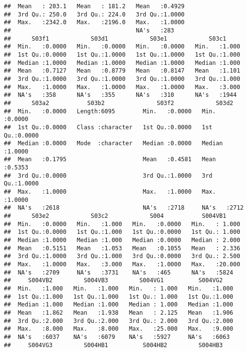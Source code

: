 \documentclass[
]{article}
\begin{document}
\begin{verbatim}
##  Mean   : 203.1   Mean   : 181.2   Mean   :0.4929                     
##  3rd Qu.: 250.0   3rd Qu.: 224.0   3rd Qu.:1.0000                     
##  Max.   :2342.0   Max.   :2196.0   Max.   :1.0000                     
##                                    NA's   :283                        
##      S03f1            S03d1            S03e1            S03c1      
##  Min.   :0.0000   Min.   :0.0000   Min.   :0.0000   Min.   :1.000  
##  1st Qu.:0.0000   1st Qu.:1.0000   1st Qu.:1.0000   1st Qu.:1.000  
##  Median :1.0000   Median :1.0000   Median :1.0000   Median :1.000  
##  Mean   :0.7127   Mean   :0.8779   Mean   :0.8147   Mean   :1.101  
##  3rd Qu.:1.0000   3rd Qu.:1.0000   3rd Qu.:1.0000   3rd Qu.:1.000  
##  Max.   :1.0000   Max.   :1.0000   Max.   :1.0000   Max.   :3.000  
##  NA's   :358      NA's   :355      NA's   :310      NA's   :1944   
##      S03a2           S03b2               S03f2            S03d2       
##  Min.   :0.0000   Length:6095        Min.   :0.0000   Min.   :0.0000  
##  1st Qu.:0.0000   Class :character   1st Qu.:0.0000   1st Qu.:0.0000  
##  Median :0.0000   Mode  :character   Median :0.0000   Median :1.0000  
##  Mean   :0.1795                      Mean   :0.4581   Mean   :0.5353  
##  3rd Qu.:0.0000                      3rd Qu.:1.0000   3rd Qu.:1.0000  
##  Max.   :1.0000                      Max.   :1.0000   Max.   :1.0000  
##  NA's   :2618                        NA's   :2718     NA's   :2712    
##      S03e2            S03c2            S004           S004VB1      
##  Min.   :0.0000   Min.   :1.000   Min.   :0.0000   Min.   : 1.000  
##  1st Qu.:0.0000   1st Qu.:1.000   1st Qu.:0.0000   1st Qu.: 1.000  
##  Median :1.0000   Median :1.000   Median :0.0000   Median : 2.000  
##  Mean   :0.5151   Mean   :1.053   Mean   :0.1055   Mean   : 2.336  
##  3rd Qu.:1.0000   3rd Qu.:1.000   3rd Qu.:0.0000   3rd Qu.: 2.500  
##  Max.   :1.0000   Max.   :3.000   Max.   :1.0000   Max.   :20.000  
##  NA's   :2709     NA's   :3731    NA's   :465      NA's   :5824    
##     S004VB2         S004VB3         S004VG1          S004VG2     
##  Min.   :1.000   Min.   :1.000   Min.   : 1.000   Min.   :1.000  
##  1st Qu.:1.000   1st Qu.:1.000   1st Qu.: 1.000   1st Qu.:1.000  
##  Median :1.000   Median :1.000   Median : 1.000   Median :1.000  
##  Mean   :1.862   Mean   :1.938   Mean   : 2.125   Mean   :1.906  
##  3rd Qu.:2.000   3rd Qu.:2.000   3rd Qu.: 2.000   3rd Qu.:2.000  
##  Max.   :8.000   Max.   :8.000   Max.   :25.000   Max.   :9.000  
##  NA's   :6037    NA's   :6079    NA's   :5927     NA's   :6063   
##     S004VG3         S004HB1          S004HB2         S004HB3     

\end{verbatim}
\end{document}

